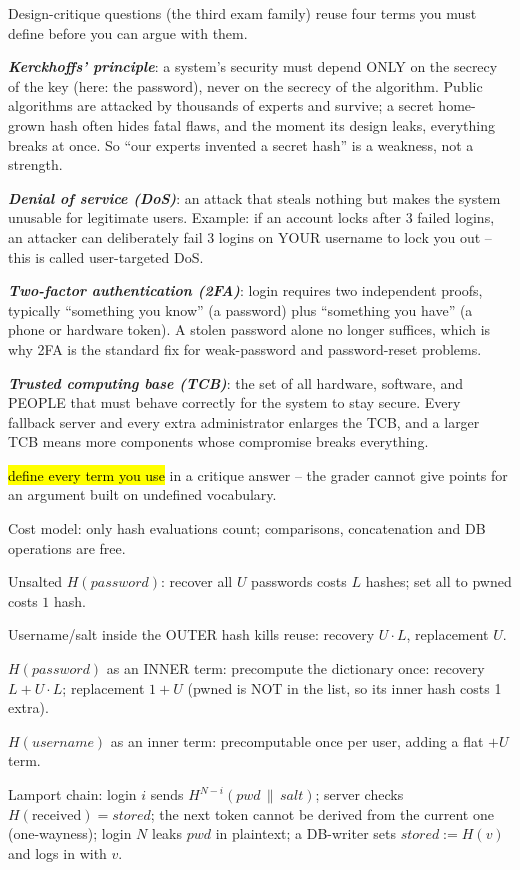 \documentclass[12pt, a4paper]{article}
\newcommand{\term}[1]{\textbf{\textit{#1}}}        %
\newcommand{\imp}[1]{\hl{#1}}                       %
\begin{document}
Design-critique questions (the third exam family) reuse four terms you must define before you can argue with them.\begin{tightitem}\item \term{Kerckhoffs' principle}: a system's security must depend ONLY on the secrecy of the key (here: the password), never on the secrecy of the algorithm. Public algorithms are attacked by thousands of experts and survive; a secret home-grown hash often hides fatal flaws, and the moment its design leaks, everything breaks at once. So ``our experts invented a secret hash'' is a weakness, not a strength.\item \term{Denial of service (DoS)}: an attack that steals nothing but makes the system unusable for legitimate users. Example: if an account locks after 3 failed logins, an attacker can deliberately fail 3 logins on YOUR username to lock you out -- this is called user-targeted DoS.\item \term{Two-factor authentication (2FA)}: login requires two independent proofs, typically ``something you know'' (a password) plus ``something you have'' (a phone or hardware token). A stolen password alone no longer suffices, which is why 2FA is the standard fix for weak-password and password-reset problems.\item \term{Trusted computing base (TCB)}: the set of all hardware, software, and PEOPLE that must behave correctly for the system to stay secure. Every fallback server and every extra administrator enlarges the TCB, and a larger TCB means more components whose compromise breaks everything.\end{tightitem}\imp{define every term you use} in a critique answer -- the grader cannot give points for an argument built on undefined vocabulary.

\begin{theorybox}
\begin{tightitem}
    \item Cost model: only hash evaluations count; comparisons, concatenation and DB operations are free.
    \item Unsalted $H(password)$: recover all $U$ passwords costs $L$ hashes; set all to pwned costs $1$ hash.
    \item Username/salt inside the OUTER hash kills reuse: recovery $U \cdot L$, replacement $U$.
    \item $H(password)$ as an INNER term: precompute the dictionary once: recovery $L + U \cdot L$; replacement $1 + U$ (pwned is NOT in the list, so its inner hash costs 1 extra).
    \item $H(username)$ as an inner term: precomputable once per user, adding a flat $+U$ term.
    \item Lamport chain: login $i$ sends $H^{N-i}(pwd \,\|\, salt)$; server checks $H(\text{received}) = stored$; the next token cannot be derived from the current one (one-wayness); login $N$ leaks $pwd$ in plaintext; a DB-writer sets $stored := H(v)$ and logs in with $v$.
\end{tightitem}
\end{theorybox}
\end{document}
